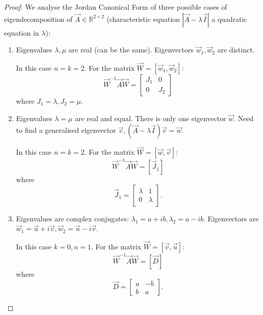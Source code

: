 \begin{proof}
	We analyse the Jordan Canonical Form of three possible cases of eigendecomposition of $\vec A \in \mathbb R^{2 \times 2}$ (characteristic equation $|\vec A - \lambda \vec I|$ a quadratic equation in $\lambda$):
	\begin{enumerate}
		\item Eigenvalues $\lambda, \mu$ are real (can be the same). Eigenvectors $\vec w_1, \vec w_2$ are distinct.
		
		In this case $n = k = 2$. For the matrix $\vec W = [\vec w_1, \vec w_2]$:
		\begin{equation*}
			\vec W^{-1} \vec A \vec W =
			\begin{bmatrix}
				J_1 & 0 \\
				0 & J_2
			\end{bmatrix}
		\end{equation*}
		where $J_1 = \lambda, J_2 = \mu$.
		\item Eigenvalues $\lambda = \mu$ are real and equal. There is only one eigenvector $\vec w$. Need to find a generalised eigenvector $\vec v, (\vec A - \lambda \vec I) \vec v = \vec w$.
		
		In this case $n = k = 2$. For the matrix $\vec W = [\vec w, \vec v]$:
		\begin{equation*}
			\vec W^{-1} \vec A \vec W = [\vec J_1]
		\end{equation*}
		where
		\begin{equation*}
			\vec J_1 = 
			\begin{bmatrix}
				\lambda & 1 \\
				0 & \lambda
			\end{bmatrix}.
		\end{equation*}
		\item Eigenvalues are complex conjugates: $\lambda_1 = a + ib, \lambda_2 = a - ib$. Eigenvectors are $\vec w_1 = \vec u + i \vec v, \vec w_2 = \vec u - i \vec v$.

		In this case $k = 0, n = 1$. For the matrix $\vec W = [\vec v, \vec u]$:
		\begin{equation*}
			\vec W^{-1} \vec A \vec W = [\vec D]
		\end{equation*}
		where
		\begin{equation*}
			\vec D =
			\begin{bmatrix}
				a & -b \\
				b & a
			\end{bmatrix}.
		\end{equation*}
	\end{enumerate}
\end{proof}